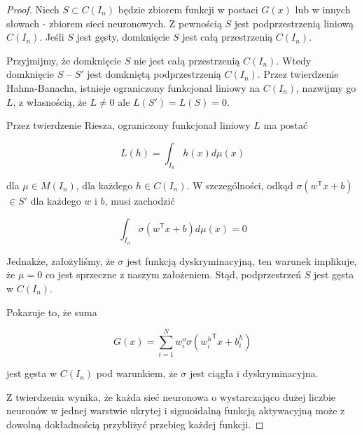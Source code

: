 \documentclass[11pt]{book}
\theoremstyle{definition}
\begin{document}
\begin{proof}
	
	
	Niech $S \subset C(I_n)$ będzie zbiorem funkcji w postaci $G(x)$ lub w innych słowach - zbiorem sieci neuronowych. Z pewnością $S$ jest podprzestrzenią liniową $C(I_n)$. Jeśli $S$ jest gęsty, domknięcie $S$ jest całą przestrzenią $C(I_n)$.
	
	Przyjmijmy, że domknięcie $S$ nie jest całą przestrzenią $C(I_n)$. Wtedy domknięcie $S$ -- $S'$ jest domkniętą podprzestrzenią $C(I_n)$. Przez twierdzenie Hahna-Banacha, istnieje ograniczony funkcjonał liniowy na $C(I_n)$, nazwijmy go $L$, z własnością, że $L \neq 0$ ale $L(S') = L(S) = 0$.
	
	Przez twierdzenie Riesza, ograniczony funkcjonał liniowy $L$ ma postać
	
	$$
	L(h) = \int_{I_n} h(x)d\mu(x)
	$$
	
	dla $\mu \in M(I_n)$, dla każdego $h \in C(I_n)$. W szczególności, odkąd $\sigma(w^\mathsf{T}x + b)$  $\in S'$ dla każdego $w$ i $b$, musi zachodzić
	
	$$
	\int_{I_n} \sigma \left(w^\mathsf{T}x + b \right) d\mu(x) = 0 
	$$
	
	Jednakże, założyliśmy, że $\sigma$ jest funkcją dyskryminacyjną, ten warunek implikuje, że $\mu = 0$ co jest sprzeczne z naszym założeniem. Stąd, podprzestrzeń $S$ jest gęsta w $C(I_n)$.
	
	Pokazuje to, że suma
	
	$$
	G\left(x\right) = \sum_{i=1}^{N} w^{o}_i \sigma\left({w^h_i}^{\mathsf{T}}x + b^h_i\right)
	$$
	
	jest gęsta w $C(I_n)$ pod warunkiem, że $\sigma$ jest ciągła i dyskryminacyjna.
	
	Z twierdzenia wynika, że każda sieć neuronowa o wystarczająco dużej liczbie neuronów w jednej warstwie ukrytej i sigmoidalną funkcją aktywacyjną może z dowolną dokładnością przybliżyć przebieg każdej funkcji.
	
\end{proof}



\end{document}
